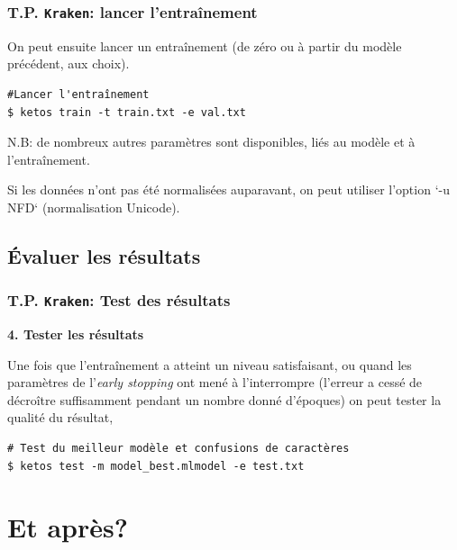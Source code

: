 \documentclass[10pt, compress,urlcolor=blue]{beamer}
\begin{document}
\begin{frame}[fragile]
\frametitle{T.P. \texttt{Kraken}: lancer l'entraînement}
    
On peut ensuite lancer un entraînement (de zéro ou à partir du modèle précédent, aux choix). 
\begin{verbatim}
#Lancer l'entraînement
$ ketos train -t train.txt -e val.txt
\end{verbatim}

N.B: de nombreux autres paramètres sont disponibles, liés au modèle et à l'entraînement.

Si les données n'ont pas été normalisées auparavant, on peut utiliser l'option
`-u NFD` (normalisation Unicode).

\end{frame}

\subsection{Évaluer les résultats}

\begin{frame}[fragile]
\frametitle{T.P. \texttt{Kraken}: Test des résultats}


\textbf{4. Tester les résultats}

Une fois que l'entraînement a atteint un niveau satisfaisant, ou quand les paramètres de l'\textit{early stopping} ont mené à l'interrompre (l'erreur a cessé de décroître suffisamment pendant un nombre donné d'époques)
on peut tester la qualité du résultat, 

\begin{verbatim}
# Test du meilleur modèle et confusions de caractères
$ ketos test -m model_best.mlmodel -e test.txt
\end{verbatim}


\end{frame}

\section{Et après?}
\end{document}
